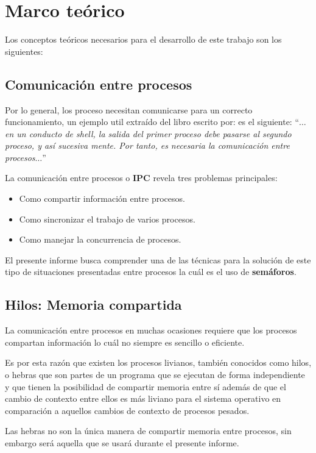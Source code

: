 \section{Marco teórico}\label{sec:MarcoTeorico}
Los conceptos teóricos necesarios para el desarrollo de este trabajo son los siguientes:

\subsection{Comunicación entre procesos}
Por lo general, los proceso necesitan comunicarse para un correcto funcionamiento, un ejemplo util extraído del libro escrito por: \textcite{tanenbaum1997sistemas} es el siguiente: ``\textit{$\dots$en un conducto de shell, la salida del primer proceso debe pasarse al segundo proceso, y así sucesiva mente. Por tanto, es necesaria la comunicación entre procesos$\dots$}''

La comunicación entre procesos o \textbf{IPC} revela tres problemas principales:
\begin{itemize}
    \item Como compartir información entre procesos.
    \item Como sincronizar el trabajo de varios procesos.
    \item Como manejar la concurrencia de procesos.
\end{itemize}

El presente informe busca comprender una de las técnicas para la solución de este tipo de situaciones presentadas entre procesos la cuál es el uso de \textbf{semáforos}.

\subsection{Hilos: Memoria compartida}
La comunicación entre procesos en muchas ocasiones requiere que los procesos compartan información lo cuál no siempre es sencillo o eficiente.

Es por esta razón que existen los procesos livianos, también conocidos como hilos, o hebras que son partes de un programa que se ejecutan de forma independiente y que tienen la posibilidad de compartir memoria entre sí además de que el cambio de contexto entre ellos es más liviano para el sistema operativo en comparación a aquellos cambios de contexto de procesos pesados.

Las hebras no son la única manera de compartir memoria entre procesos, sin embargo será aquella que se usará durante el presente informe.

